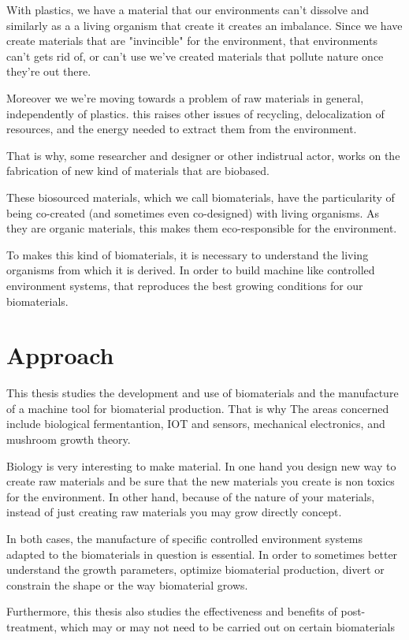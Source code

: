 With plastics, we have a material that our environments can't dissolve and similarly as a a living organism that create it creates an imbalance. Since we have create materials that are "invincible" for the environment,  that environments can't gets rid of, or can't use we've created materials that pollute nature once they're out there.

Moreover we we're moving towards a problem of raw materials in general, independently of plastics. this raises other issues of recycling, delocalization of resources, and the energy needed to extract them from the environment.

That is why, some researcher and designer or other indistrual actor, works on the fabrication of new kind of materials that are biobased.
 
These biosourced materials, which we call biomaterials, have the particularity of being co-created (and sometimes even co-designed) with living organisms. As they are organic materials, this makes them eco-responsible for the environment. 

To makes this kind of biomaterials, it is necessary to understand the living organisms from which it is derived. In order to build machine like controlled environment systems, that reproduces the best growing conditions for our biomaterials.

\section{Approach}
This thesis studies the development and use of biomaterials and the manufacture of a machine tool for biomaterial production.
That is why The areas concerned include biological fermentantion, IOT and sensors, mechanical electronics, and mushroom growth theory. 

Biology is very interesting to make material. In one hand you design new way to create raw materials and be sure that the new materials you create is non toxics for the environment. In other hand, because of the nature of your materials, instead of just creating raw materials you may grow directly concept. 

In both cases, the manufacture of specific controlled environment systems adapted to the biomaterials in question is essential. 
In order to sometimes better understand the growth parameters, optimize biomaterial production, divert or constrain the shape or the way biomaterial grows. 

Furthermore, this thesis also studies the effectiveness and benefits of post-treatment, which may or may not need to be carried out on certain biomaterials 

